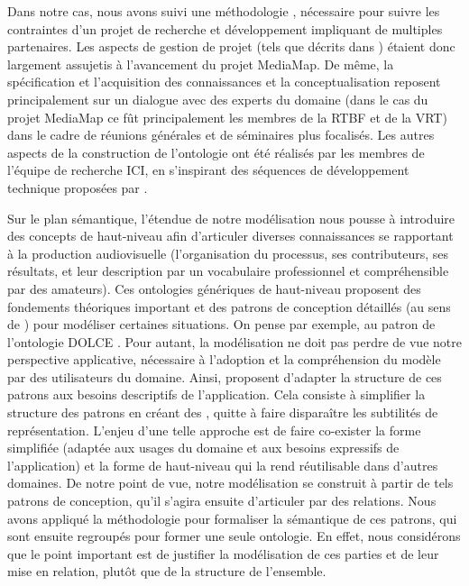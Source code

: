 Dans notre cas, nous avons suivi une méthodologie , nécessaire pour suivre les contraintes d'un projet de recherche et développement impliquant de multiples partenaires.
Les aspects de gestion de projet (tels que décrits dans ) étaient donc largement assujetis à l'avancement du projet MediaMap.
De même, la spécification et l'acquisition des connaissances et la conceptualisation reposent principalement sur un dialogue avec des experts du domaine (dans le cas du projet MediaMap ce fût principalement les membres de la RTBF et de la VRT) dans le cadre de réunions générales et de séminaires plus focalisés.
Les autres aspects de la construction de l'ontologie ont été réalisés par les membres de l'équipe de recherche ICI, en s'inspirant des séquences de développement technique proposées par .

Sur le plan sémantique, l'étendue de notre modélisation nous pousse à introduire des concepts de haut-niveau afin d'articuler diverses connaissances se rapportant à la production audiovisuelle (l'organisation du processus, ses contributeurs, ses résultats, et leur description par un vocabulaire professionnel et compréhensible par des amateurs).
Ces ontologies génériques de haut-niveau proposent des fondements théoriques important et des patrons de conception détaillés (au sens de \cite{Isaac2005}) pour modéliser certaines situations. 
On pense par exemple, au patron  de l'ontologie DOLCE . 
Pour autant, la modélisation ne doit pas perdre de vue notre perspective applicative, nécessaire à l'adoption et la compréhension du modèle par des utilisateurs du domaine.
Ainsi, \citeauthor{Isaac2005} proposent d'adapter la structure de ces patrons aux besoins descriptifs de l'application.
Cela consiste à simplifier la structure des patrons en créant des , quitte à faire disparaître les subtilités de représentation.
L'enjeu d'une telle approche est de faire co-exister la forme simplifiée (adaptée aux usages du domaine et aux besoins expressifs de l'application) et la forme de haut-niveau qui la rend réutilisable dans d'autres domaines.
De notre point de vue, notre modélisation se construit à partir de tels patrons de conception, qu'il s'agira ensuite d'articuler par des relations. 
Nous avons appliqué la méthodologie  pour formaliser la sémantique de ces patrons, qui sont ensuite regroupés pour former une seule ontologie.
En effet, nous considérons que le point important est de justifier la modélisation de ces parties et de leur mise en relation, plutôt que de la structure de l'ensemble.














